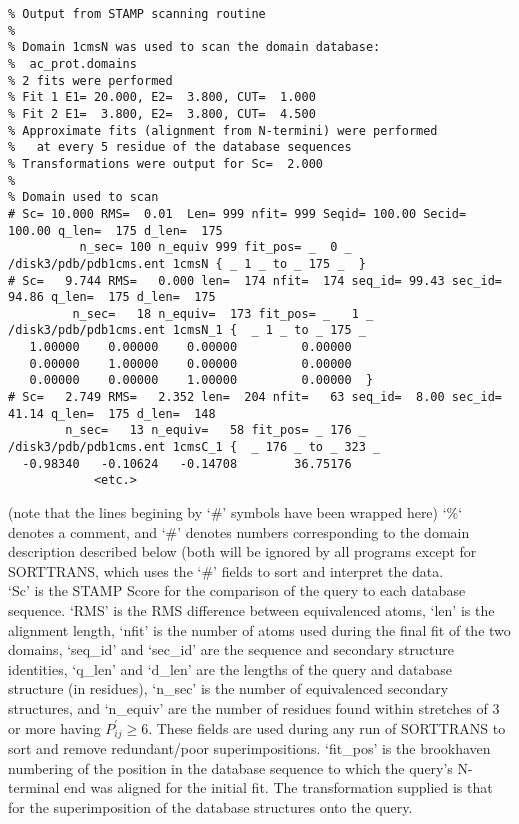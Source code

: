 \begin{scriptsize}\begin{verbatim}
% Output from STAMP scanning routine
%
% Domain 1cmsN was used to scan the domain database:
%  ac_prot.domains
% 2 fits were performed
% Fit 1 E1= 20.000, E2=  3.800, CUT=  1.000
% Fit 2 E1=  3.800, E2=  3.800, CUT=  4.500
% Approximate fits (alignment from N-termini) were performed
%   at every 5 residue of the database sequences 
% Transformations were output for Sc=  2.000
% 
% Domain used to scan 
# Sc= 10.000 RMS=  0.01  Len= 999 nfit= 999 Seqid= 100.00 Secid= 100.00 q_len=  175 d_len=  175 
          n_sec= 100 n_equiv 999 fit_pos= _  0 _ 
/disk3/pdb/pdb1cms.ent 1cmsN { _ 1 _ to _ 175 _  }
# Sc=   9.744 RMS=   0.000 len=  174 nfit=  174 seq_id= 99.43 sec_id= 94.86 q_len=  175 d_len=  175 
         n_sec=   18 n_equiv=  173 fit_pos= _   1 _ 
/disk3/pdb/pdb1cms.ent 1cmsN_1 {  _ 1 _ to _ 175 _  
   1.00000    0.00000    0.00000         0.00000 
   0.00000    1.00000    0.00000         0.00000 
   0.00000    0.00000    1.00000         0.00000  }
# Sc=   2.749 RMS=   2.352 len=  204 nfit=   63 seq_id=  8.00 sec_id= 41.14 q_len=  175 d_len=  148 
        n_sec=   13 n_equiv=   58 fit_pos= _ 176 _ 
/disk3/pdb/pdb1cms.ent 1cmsC_1 {  _ 176 _ to _ 323 _  
  -0.98340   -0.10624   -0.14708        36.75176 
			<etc.>
\end{verbatim} \end{scriptsize}

(note that the lines begining by `\#' symbols have been wrapped here)
`\%` denotes a comment, and `\#' denotes numbers corresponding to the
domain description described below (both will be ignored by all
programs except for SORTTRANS, which uses the `\#' fields to sort
and interpret the data. \\

`Sc' is the STAMP Score for the comparison of the query to each 
database sequence. `RMS' is the RMS difference between equivalenced
atoms, `len' is the alignment length, `nfit' is the number of atoms
used during the final fit of the two domains, `seq\_id' and `sec\_id' are the
sequence and secondary structure identities, `q\_len' and `d\_len' are
the lengths of the query and database structure (in residues), `n\_sec'
is the number of equivalenced secondary structures, and `n\_equiv' are
the number of residues found within stretches of 3 or more having 
$P_{ij}^{\prime} \geq 6$.  These fields are used during any
run of SORTTRANS to sort and remove redundant/poor superimpositions.
`fit\_pos' is the 
brookhaven numbering of the position in the database sequence to 
which the query's N-terminal end was aligned for the initial fit.
The transformation supplied is that for the superimposition of the 
database structures onto the query. 

